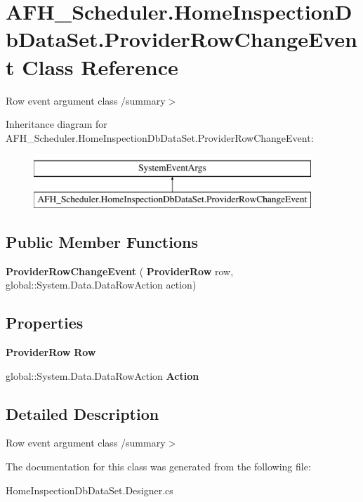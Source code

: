 \section{A\+F\+H\+\_\+\+Scheduler.\+Home\+Inspection\+Db\+Data\+Set.\+Provider\+Row\+Change\+Event Class Reference}
\label{class_a_f_h___scheduler_1_1_home_inspection_db_data_set_1_1_provider_row_change_event}


Row event argument class /summary$>$  


Inheritance diagram for A\+F\+H\+\_\+\+Scheduler.\+Home\+Inspection\+Db\+Data\+Set.\+Provider\+Row\+Change\+Event\+:\begin{figure}[H]
\begin{center}
\leavevmode
\includegraphics[height=2.000000cm]{class_a_f_h___scheduler_1_1_home_inspection_db_data_set_1_1_provider_row_change_event}
\end{center}
\end{figure}
\subsection*{Public Member Functions}
\begin{DoxyCompactItemize}
\item 
\mbox{\label{class_a_f_h___scheduler_1_1_home_inspection_db_data_set_1_1_provider_row_change_event_ae64def5540a4fc9e53bb4deeddfc931d}} 
{\bfseries Provider\+Row\+Change\+Event} (\textbf{ Provider\+Row} row, global\+::\+System.\+Data.\+Data\+Row\+Action action)
\end{DoxyCompactItemize}
\subsection*{Properties}
\begin{DoxyCompactItemize}
\item 
\mbox{\label{class_a_f_h___scheduler_1_1_home_inspection_db_data_set_1_1_provider_row_change_event_a4b7461efd63fc7c0e97d50e2d380a277}} 
\textbf{ Provider\+Row} {\bfseries Row}\hspace{0.3cm}{\ttfamily  [get]}
\item 
\mbox{\label{class_a_f_h___scheduler_1_1_home_inspection_db_data_set_1_1_provider_row_change_event_ac7a1d4a9efd4ec682f5525c4bcca5aac}} 
global\+::\+System.\+Data.\+Data\+Row\+Action {\bfseries Action}\hspace{0.3cm}{\ttfamily  [get]}
\end{DoxyCompactItemize}


\subsection{Detailed Description}
Row event argument class /summary$>$ 

The documentation for this class was generated from the following file\+:\begin{DoxyCompactItemize}
\item 
Home\+Inspection\+Db\+Data\+Set.\+Designer.\+cs\end{DoxyCompactItemize}
